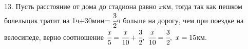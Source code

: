 13. Пусть расстояние от дома до стадиона равно $x$км, тогда так как пешком болельщик тратит на 1ч$+$30мин$=\cfrac{3}{2}$ч больше на дорогу, чем при поездке на велосипеде, верно соотношение $\cfrac{x}{5}=\cfrac{x}{10}+\cfrac{3}{2},\ \cfrac{x}{10}=\cfrac{3}{2},\ x=15$км.\\
